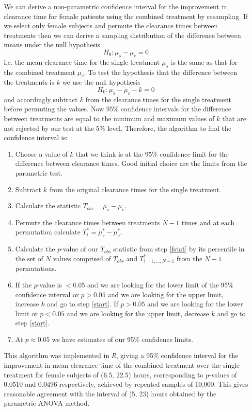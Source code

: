 We can derive a non-parametric confidence interval for the improvement in clearance time for female patients using the combined treatment by resampling. If we select only female subjects and permute the clearance times between treatments then we can derive a sampling distribution of the difference between means under the null hypothesis
$$H_{0}:\mu_{s}-\mu_{c}=0$$
i.e. the mean clearance time for the single treatment $\mu_{s}$ is the same as that for the combined treatment $\mu_{c}$. To test the hypothesis that the difference between the treatments is $k$ we use the null hypothesis
$$H_{0}:\mu_{s}-\mu_{c}-k=0$$
and accordingly subtract $k$ from the clearance times for the single treatment before permuting the values. Now 95\% confidence intervals for the difference between treatments are equal to the minimum and maximum values of $k$ that are not rejected by our test at the 5\% level. Therefore, the algorithm to find the confidence interval is:
\begin{enumerate}
\item Choose a value of $k$ that we think is at the 95\% confidence limit for the difference between clearance times. Good initial choice are the limits from the parametric test.
\item Subtract $k$ from the original clearance times for the single treatment.\label{start}
\item Calculate the statistic $T_{obs}=\mu_{s}-\mu_{c}$.\label{fstat}
\item Permute the clearance times between treatments $N-1$ times and at each permutation calculate $T^{*}_{i}=\mu_{s}^{*}-\mu_{c}^{*}$.
\item Calculate the $p$-value of our $T_{obs}$ statistic from step \ref{fstat} by its percentile in the set of $N$ values comprised of $T_{obs}$ and $T_{i=1,...,N-1}^{*}$ from the $N-1$ permutations.
\item If the $p$-value is $<0.05$ and we are looking for the lower limit of the 95\% confidence interval or $p>0.05$ and we are looking for the upper limit, increase $k$ and go to step \ref{start}. If $p>0.05$ and we are looking for the lower limit or $p<0.05$ and we are looking for the upper limit, decrease $k$ and go to step \ref{start}.
\item At $p\approx 0.05$ we have estimates of our 95\% confidence limits.
\end{enumerate}
This algorithm was implemented in \emph{R}, giving a 95\% confidence interval for the improvement in mean clearance time of the combined treatment over the single treatment for female subjects of (6.5, 22.5) hours, corresponding to $p$-values of 0.0510 and 0.0496 respectively, achieved by repeated samples of 10,000. This gives reasonable agreement with the interval of (5, 23) hours obtained by the parametric ANOVA method.
